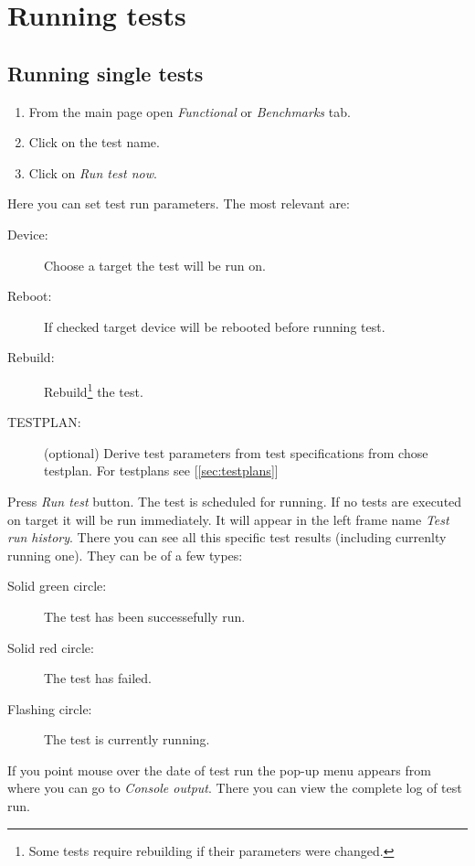 \section{Running tests}
\label{sec:running-tests}

\subsection{Running single tests}
\label{sec:running-single}

\begin{enumerate}
\item From the main page open \textit{Functional} or \textit{Benchmarks} tab.
\item Click on the test name.
\item Click on \textit{Run test now}.
\end{enumerate}

Here you can set test run parameters.
The most relevant are:

\begin{description}
\item[Device:] Choose a target the test will be run on.
\item[Reboot:] If checked target device will be rebooted before running test.
\item[Rebuild:] Rebuild\footnote{Some tests require rebuilding if their parameters were changed.} the test.
\item[TESTPLAN:] (optional) Derive test parameters from test specifications from chose testplan. For testplans see [\ref{sec:testplans}]
\end{description}

Press \textit{Run test} button. The test is scheduled for running. If no tests are executed on target it will be run immediately. It will appear in the left frame name \textit{Test run history}. There you can see all this specific test results (including currenlty running one). They can be of a few types:
\begin{description}
\item[Solid green circle:] The test has been successefully run.
\item [Solid red circle:] The test has failed.
\item [Flashing circle:] The test is currently running.
\end{description}

If you point mouse over the date of test run the pop-up menu appears from where you can go to \textit{Console output}. There you can view the complete log of test run.

